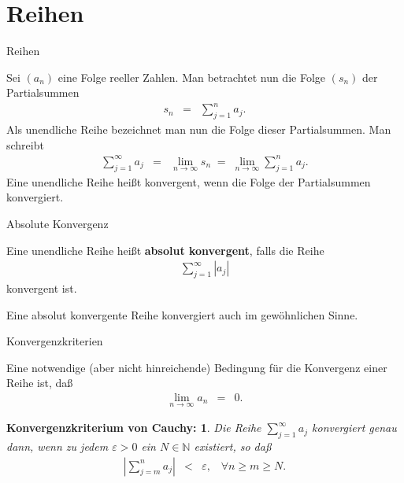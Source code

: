 \documentclass[german]{beamer}
\newcommand{\bq}{\begin{eqnarray*}}
\newcommand{\eq}{\end{eqnarray*}}
\newcommand{\eps}{\varepsilon}
\newtheorem*{mytheorem19}{Konvergenzkriterium von Cauchy:}
\begin{document}

\section{Reihen}

\frame{\sectionpage}

\begin{frame}{Reihen}

Sei $(a_n)$ eine Folge reeller Zahlen. Man betrachtet nun die Folge $(s_n)$ der Partialsummen
\bq
 s_n & = & \sum\limits_{j=1}^n a_j.
\eq
Als unendliche Reihe bezeichnet man nun die Folge dieser Partialsummen.
Man schreibt
\bq
 \sum\limits_{j=1}^\infty a_j & = & \lim\limits_{n \rightarrow \infty} s_n \; = \; \lim\limits_{n \rightarrow \infty} \sum\limits_{j=1}^n a_j.
\eq
Eine unendliche Reihe hei{\ss}t konvergent, wenn die Folge der Partialsummen konvergiert.

\end{frame}

\begin{frame}{Absolute Konvergenz}

\begin{definition}
Eine unendliche Reihe hei{\ss}t {\bf absolut konvergent}, falls die Reihe
\bq
 \sum\limits_{j=1}^\infty \left| a_j \right|
\eq
konvergent ist.
\end{definition}

\begin{theorem}
Eine absolut konvergente Reihe konvergiert auch im gew\"ohnlichen Sinne.
\end{theorem}

\end{frame}

\begin{frame}{Konvergenzkriterien}

\begin{theorem}
Eine notwendige (aber nicht hinreichende) Bedingung f\"ur die Konvergenz einer 
Reihe ist, da{\ss}
\bq
 \lim\limits_{n \rightarrow \infty} a_n & = & 0.
\eq
\end{theorem}

\begin{mytheorem19}
Die Reihe $\sum\limits_{j=1}^\infty a_j$ konvergiert genau dann,
wenn zu jedem $\eps > 0$ ein $N \in \mathbb N$ existiert, so da{\ss}
\bq
 \left|  \sum\limits_{j=m}^n a_j \right| & < & \eps,
 \;\;\; \forall n \ge m \ge N.
\eq
\end{mytheorem19}

\end{frame}
\end{document}
